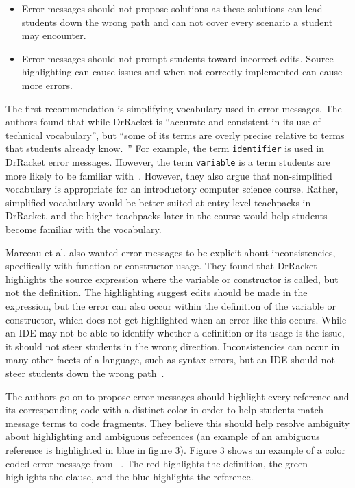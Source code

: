 \documentclass{sig-alternate}
\begin{document}
\begin{itemize}
	\item Error messages should not propose solutions as these solutions can lead students down the wrong path and can not cover every scenario a student may encounter.
	\item Error messages should not prompt students toward incorrect edits. Source highlighting can cause issues and when not correctly implemented can cause more errors.
\end{itemize}

The first recommendation is simplifying vocabulary used in error messages.
The authors found that while DrRacket is ``accurate and consistent in its use of technical vocabulary'', but ``some of its terms are overly precise relative to terms that students already know.~\cite{Marceau:2011:MYL:2048237.2048241}''
For example, the term \texttt{identifier} is used in DrRacket error messages. However, the term \texttt{variable} is a term students are more likely to be familiar with~\cite{Marceau:2011:MYL:2048237.2048241}.
However, they also argue that non-simplified vocabulary is appropriate for an introductory computer science course.
Rather, simplified vocabulary would be better suited at entry-level teachpacks in DrRacket, and the higher teachpacks later in the course would help students become familiar with the vocabulary.

Marceau et al. also wanted error messages to be explicit about inconsistencies, specifically with function or constructor usage.
They found that DrRacket highlights the source expression where the variable or constructor is called, but not the definition.
The highlighting suggest edits should be made in the expression, but the error can also occur within the definition of the variable or constructor, which does not get highlighted when an error like this occurs.
While an IDE may not be able to identify whether a definition or its usage is the issue, it should not steer students in the wrong direction.
Inconsistencies can occur in many other facets of a language, such as syntax errors, but an IDE should not steer students down the wrong path~\cite{Marceau:2011:MYL:2048237.2048241}.

The authors go on to propose error messages should highlight every reference and its corresponding code with a distinct color in order to help students match message terms to code fragments.
They believe this should help resolve ambiguity about highlighting and ambiguous references (an example of an ambiguous reference is highlighted in blue in figure 3).
Figure 3 shows an example of a color coded error message from ~\cite{Marceau:2011:MYL:2048237.2048241}.
The red highlights the definition, the green highlights the clause, and the blue highlights the reference.
\end{document}
